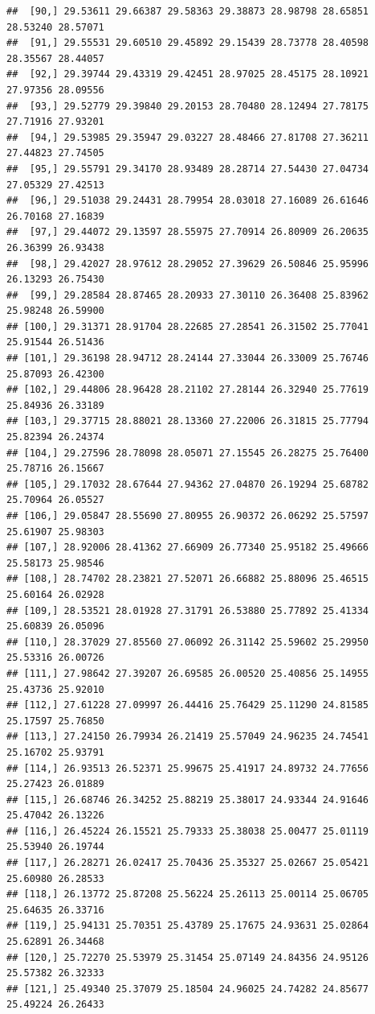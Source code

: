 \documentclass{article}\usepackage[]{graphicx}\usepackage[]{color}
\makeatletter
\newenvironment{kframe}{%
 \def\at@end@of@kframe{}%
 \ifinner\ifhmode%
  \def\at@end@of@kframe{\end{minipage}}%
  \begin{minipage}{\columnwidth}%
 \fi\fi%
 \def\FrameCommand##1{\hskip\@totalleftmargin \hskip-\fboxsep
 \colorbox{shadecolor}{##1}\hskip-\fboxsep
     \hskip-\linewidth \hskip-\@totalleftmargin \hskip\columnwidth}%
 \MakeFramed {\advance\hsize-\width
   \@totalleftmargin\z@ \linewidth\hsize
   \@setminipage}}%
 {\par\unskip\endMakeFramed%
 \at@end@of@kframe}
\newenvironment{knitrout}{}{} %
\makeatother
\begin{document}
\begin{knitrout}
\begin{kframe}
\begin{verbatim}
##  [90,] 29.53611 29.66387 29.58363 29.38873 28.98798 28.65851 28.53240 28.57071
##  [91,] 29.55531 29.60510 29.45892 29.15439 28.73778 28.40598 28.35567 28.44057
##  [92,] 29.39744 29.43319 29.42451 28.97025 28.45175 28.10921 27.97356 28.09556
##  [93,] 29.52779 29.39840 29.20153 28.70480 28.12494 27.78175 27.71916 27.93201
##  [94,] 29.53985 29.35947 29.03227 28.48466 27.81708 27.36211 27.44823 27.74505
##  [95,] 29.55791 29.34170 28.93489 28.28714 27.54430 27.04734 27.05329 27.42513
##  [96,] 29.51038 29.24431 28.79954 28.03018 27.16089 26.61646 26.70168 27.16839
##  [97,] 29.44072 29.13597 28.55975 27.70914 26.80909 26.20635 26.36399 26.93438
##  [98,] 29.42027 28.97612 28.29052 27.39629 26.50846 25.95996 26.13293 26.75430
##  [99,] 29.28584 28.87465 28.20933 27.30110 26.36408 25.83962 25.98248 26.59900
## [100,] 29.31371 28.91704 28.22685 27.28541 26.31502 25.77041 25.91544 26.51436
## [101,] 29.36198 28.94712 28.24144 27.33044 26.33009 25.76746 25.87093 26.42300
## [102,] 29.44806 28.96428 28.21102 27.28144 26.32940 25.77619 25.84936 26.33189
## [103,] 29.37715 28.88021 28.13360 27.22006 26.31815 25.77794 25.82394 26.24374
## [104,] 29.27596 28.78098 28.05071 27.15545 26.28275 25.76400 25.78716 26.15667
## [105,] 29.17032 28.67644 27.94362 27.04870 26.19294 25.68782 25.70964 26.05527
## [106,] 29.05847 28.55690 27.80955 26.90372 26.06292 25.57597 25.61907 25.98303
## [107,] 28.92006 28.41362 27.66909 26.77340 25.95182 25.49666 25.58173 25.98546
## [108,] 28.74702 28.23821 27.52071 26.66882 25.88096 25.46515 25.60164 26.02928
## [109,] 28.53521 28.01928 27.31791 26.53880 25.77892 25.41334 25.60839 26.05096
## [110,] 28.37029 27.85560 27.06092 26.31142 25.59602 25.29950 25.53316 26.00726
## [111,] 27.98642 27.39207 26.69585 26.00520 25.40856 25.14955 25.43736 25.92010
## [112,] 27.61228 27.09997 26.44416 25.76429 25.11290 24.81585 25.17597 25.76850
## [113,] 27.24150 26.79934 26.21419 25.57049 24.96235 24.74541 25.16702 25.93791
## [114,] 26.93513 26.52371 25.99675 25.41917 24.89732 24.77656 25.27423 26.01889
## [115,] 26.68746 26.34252 25.88219 25.38017 24.93344 24.91646 25.47042 26.13226
## [116,] 26.45224 26.15521 25.79333 25.38038 25.00477 25.01119 25.53940 26.19744
## [117,] 26.28271 26.02417 25.70436 25.35327 25.02667 25.05421 25.60980 26.28533
## [118,] 26.13772 25.87208 25.56224 25.26113 25.00114 25.06705 25.64635 26.33716
## [119,] 25.94131 25.70351 25.43789 25.17675 24.93631 25.02864 25.62891 26.34468
## [120,] 25.72270 25.53979 25.31454 25.07149 24.84356 24.95126 25.57382 26.32333
## [121,] 25.49340 25.37079 25.18504 24.96025 24.74282 24.85677 25.49224 26.26433

\end{verbatim}
\end{kframe}
\end{knitrout}
\end{document}
